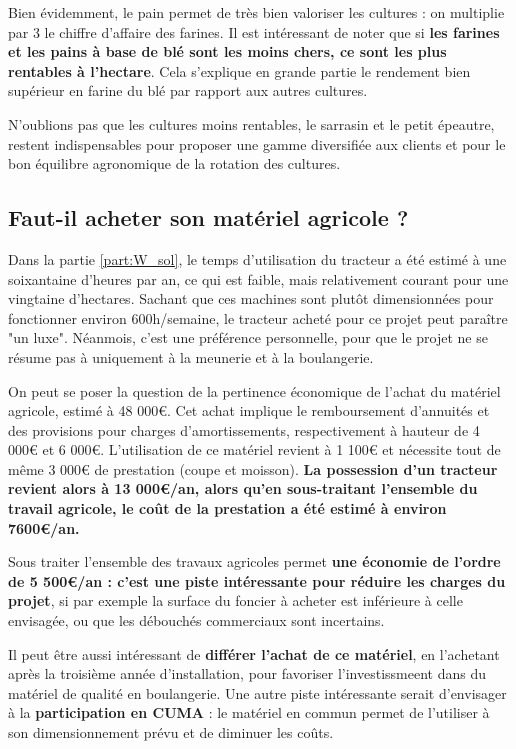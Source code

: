 \documentclass{book}
\begin{document}
Bien évidemment, le pain permet de très bien valoriser les cultures : on multiplie par 3 le chiffre d'affaire des farines. Il est intéressant de noter que si \textbf{les farines et les pains à base de blé sont les moins chers, ce sont les plus rentables à l'hectare}. Cela s'explique en grande partie le rendement bien supérieur en farine du blé par rapport aux autres cultures. 

N'oublions pas que les cultures moins rentables, le sarrasin et le petit épeautre, restent indispensables pour proposer une gamme diversifiée aux clients et pour le bon équilibre agronomique de la rotation des cultures.

\subsection{Faut-il acheter son matériel agricole ?}

Dans la partie \ref{part:W_sol}, le temps d'utilisation du tracteur a été estimé à une soixantaine d'heures par an, ce qui est faible, mais relativement courant pour une vingtaine d'hectares. Sachant que ces machines sont plutôt dimensionnées pour fonctionner environ 600h/semaine, le tracteur acheté pour ce projet peut paraître "un luxe". Néanmois, c'est une préférence personnelle, pour que le projet ne se résume pas à uniquement à la meunerie et à la boulangerie.

On peut se poser la question de la pertinence économique de l'achat du matériel agricole, estimé à 48 000\euro{}. Cet achat implique le remboursement d'annuités et des provisions pour charges d'amortissements, respectivement à hauteur de 4 000\euro{} et 6 000\euro{}. L'utilisation de ce matériel revient à 1 100\euro{} et nécessite tout de même 3 000\euro{} de prestation (coupe et moisson). \textbf{La possession d'un tracteur revient alors à 13 000\euro{}/an, alors qu'en sous-traitant l'ensemble du travail agricole, le coût de la prestation a été estimé à environ 7600\euro{}/an.} 

Sous traiter l'ensemble des travaux agricoles permet \textbf{une économie de l'ordre de 5 500\euro{}/an : c'est une piste intéressante pour réduire les charges du projet}, si par exemple la surface du foncier à acheter est inférieure à celle envisagée, ou que les débouchés commerciaux sont incertains. 

Il peut être aussi intéressant de \textbf{différer l'achat de ce matériel}, en l'achetant après la troisième année d'installation, pour favoriser l'investissmeent dans du matériel de qualité en boulangerie. Une autre piste intéressante serait d'envisager à la \textbf{participation en CUMA} : le matériel en commun permet de l'utiliser à son dimensionnement prévu et de diminuer les coûts.
\end{document}
